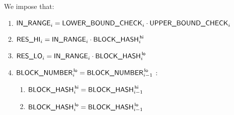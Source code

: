 We impose that:
\begin{enumerate}
	\item $\inRange_{i} = \lowerBoundCheck_{i} \cdot \upperBoundCheck_{i}$
	\item $\resHi_{i} = \inRange_{i} \cdot \blockHash\high_{i}$
	\item $\resLo_{i} = \inRange_{i} \cdot \blockHash\low_{i}$
	\item \If $\blockNumber\low_{i} = \blockNumber\low_{i-1}$ \Then:
	\begin{enumerate}
		\item $\blockHash\high_{i} = \blockHash\high_{i-1}$
		\item $\blockHash\low _{i} = \blockHash\low _{i-1}$
	\end{enumerate}
\end{enumerate}
